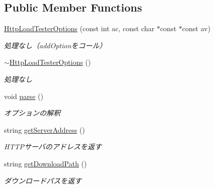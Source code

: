 \subsection*{Public Member Functions}
\begin{DoxyCompactItemize}
\item 
\mbox{\label{class_http_load_tester_options_a7c4396abdb5a1fbdb7c46ee9a42758fe}} 
\mbox{\hyperlink{class_http_load_tester_options_a7c4396abdb5a1fbdb7c46ee9a42758fe}{Http\+Load\+Tester\+Options}} (const int ac, const char $\ast$const $\ast$const av)
\begin{DoxyCompactList}\small\item\em 処理なし（add\+Optionをコール） \end{DoxyCompactList}\item 
\mbox{\label{class_http_load_tester_options_a0bb3528400ff9cd78db9e3f07fe4f04c}} 
\mbox{\hyperlink{class_http_load_tester_options_a0bb3528400ff9cd78db9e3f07fe4f04c}{$\sim$\+Http\+Load\+Tester\+Options}} ()
\begin{DoxyCompactList}\small\item\em 処理なし \end{DoxyCompactList}\item 
void \mbox{\hyperlink{class_http_load_tester_options_a5b5ce6c59de007c423d7da2481622b09}{parse}} ()
\begin{DoxyCompactList}\small\item\em オプションの解釈 \end{DoxyCompactList}\item 
\mbox{\label{class_http_load_tester_options_a63cbd4a342e44b6a7df5ba256fdd1570}} 
string \mbox{\hyperlink{class_http_load_tester_options_a63cbd4a342e44b6a7df5ba256fdd1570}{get\+Server\+Address}} ()
\begin{DoxyCompactList}\small\item\em H\+T\+T\+Pサーバのアドレスを返す \end{DoxyCompactList}\item 
\mbox{\label{class_http_load_tester_options_aa93d967c1a6b0f441dbd0b076bac0280}} 
string \mbox{\hyperlink{class_http_load_tester_options_aa93d967c1a6b0f441dbd0b076bac0280}{get\+Download\+Path}} ()
\begin{DoxyCompactList}\small\item\em ダウンロードパスを返す \end{DoxyCompactList}\item 

\end{DoxyCompactItemize}

